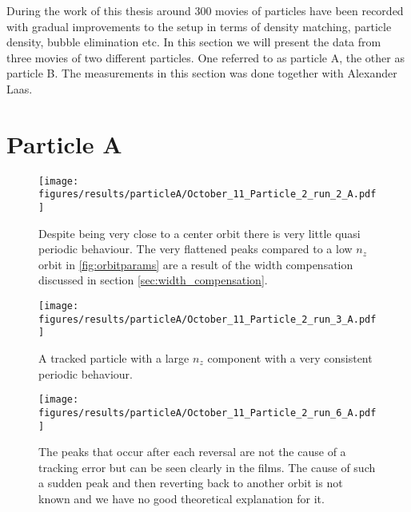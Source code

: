 During the work of this thesis around 300 movies of particles have been recorded with gradual improvements to the setup in terms of density matching, particle density, bubble elimination etc. In this section we will present the data from three movies of two different particles. One referred to as particle A, the other as particle B. The measurements in this section was done together with Alexander Laas.

\section{Particle A}

%



\begin{figure}[H]
\begin{center}
\texttt{[image: figures/results/particleA/October\_11\_Particle\_2\_run\_2\_A.pdf]}
\end{center}
\caption{Despite being very close to a center orbit there is very little quasi periodic behaviour. The very flattened peaks compared to a low $n_z$ orbit in \ref{fig:orbitparams} are a result of the width compensation discussed in section \ref{sec:width_compensation}.}
\label{fig:particleA1}
\end{figure}

\begin{figure}[H]
\begin{center}
\texttt{[image: figures/results/particleA/October\_11\_Particle\_2\_run\_3\_A.pdf]}
\end{center}
\caption{A tracked particle with a large $n_z$ component with a very consistent periodic behaviour.}
\label{fig:particleA2}
\end{figure}

\begin{figure}[H]
\begin{center}
\texttt{[image: figures/results/particleA/October\_11\_Particle\_2\_run\_6\_A.pdf]}
\end{center}
\caption{The peaks that occur after each reversal are not the cause of a tracking error but can be seen clearly in the films. The cause of such a sudden peak and then reverting back to another orbit is not known and we have no good theoretical explanation for it.}
\label{fig:particleA3}
\end{figure}

